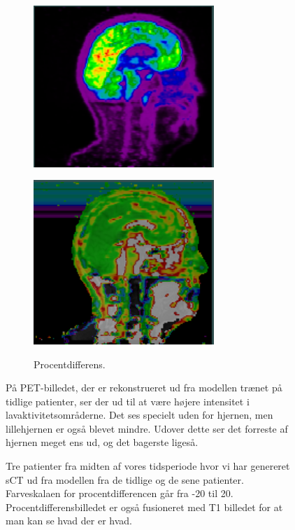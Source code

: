 \begin{figure}
\begin{subfigure}[b]{0.3\textwidth}
        \includegraphics[width=0.75\textwidth]{colager/over_tid_pet/over_tid_210445_late.png}
        \label{col:over_time_pet_pat3_late}
    \end{subfigure}\hfill
    \begin{subfigure}[b]{0.3\textwidth}
        \caption{Procentdifferens.}
        \includegraphics[width=0.75\textwidth]{colager/over_tid_pet/over_tid_210445_pd.png}
        \label{col:over_time_pet_pat3_pd}
    \end{subfigure}
    \caption{Tre patienter fra midten af vores tidsperiode hvor vi har genereret sCT ud fra modellen fra de tidlige og de sene patienter. Farveskalaen for procentdifferencen går fra -20 til 20. Procentdifferensbilledet er også fusioneret med T1 billedet for at man kan se hvad der er hvad.}
    \label{col:over_time_pet}


På PET-billedet, der er rekonstrueret ud fra modellen trænet på tidlige
patienter, ser der ud til at være højere intensitet i
lavaktivitetsområderne. Det ses specielt uden for hjernen, men
lillehjernen er også blevet mindre. Udover dette ser det forreste af
hjernen meget ens ud, og det bagerste ligeså.


\end{figure}
